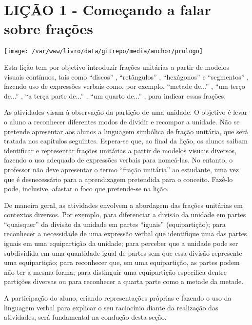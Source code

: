 \documentclass[a4paper,12pt,twoside]{book}
\begin{document}
\chapter{ LIÇÃO 1 - Começando a falar sobre frações }


\texttt{[image: /var/www/livro/data/gitrepo/media/anchor/prologo]}



\begin{professor*}[breakable]{}{}   Esta lição tem por objetivo introduzir frações unitárias a partir de modelos visuais contínuos, tais como   ``discos''  ,   ``retângulos''  ,   ``hexágonos''   e   ``segmentos''  , fazendo uso de expressões verbais como, por exemplo,   ``metade de...''  ,   ``um terço de...''  ,   ``a terça parte de...''  ,   ``um quarto de...''  , para indicar essas frações.    
  
  As atividades visam à observação da partição de uma unidade. O objetivo é levar o aluno a reconhecer diferentes modos de dividir e recompor a unidade. Não se pretende apresentar aos alunos a linguagem simbólica de fração unitária, que será tratada nos capítulos seguintes. Espera-se que, ao final da lição, os alunos saibam identificar e representar frações unitárias a partir de modelos visuais diversos, fazendo o uso adequado de expressões verbais para nomeá-las. No entanto, o professor não deve apresentar o termo   ``fração unitária''   ao estudante, uma vez que é desnecessário para a aprendizagem pretendida para o conceito. Fazê-lo pode, inclusive, afastar o foco que pretende-se na lição.  
  
  De maneira geral, as atividades envolvem a abordagem das frações unitárias em contextos diversos. Por exemplo, para diferenciar a divisão da unidade em partes   ``quaisquer''   da divisão da unidade em partes   ``iguais''   (equipartição); para reconhecer a necessidade de uma expressão verbal que identifique uma das partes iguais em uma equipartição da unidade; para perceber que a unidade pode ser subdividida em uma quantidade igual de partes sem que essa divisão represente uma equipartição; para reconhecer que, em uma equipartição, as partes podem não ter a mesma forma; para distinguir uma equipartição específica dentre partições diversas ou para reconhecer a quarta parte como a metade da metade.  
  
  A participação do aluno, criando representações próprias e fazendo o uso da linguagem verbal para explicar o seu raciocínio diante da realização das atividades, será fundamental na condução desta seção.  
  

\end{professor*}
\end{document}

